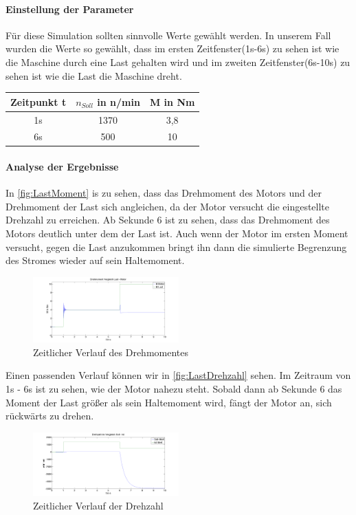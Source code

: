 \paragraph{Einstellung der Parameter}
	Für diese Simulation sollten sinnvolle Werte gewählt werden. In unserem Fall wurden die Werte so gewählt, dass im ersten Zeitfenster(1s-6s) zu sehen ist wie die Maschine durch eine Last gehalten wird und im zweiten Zeitfenster(6s-10s) zu sehen ist wie die Last die Maschine dreht.\\\par
	\begin{center}
		\begin{tabular}{c|c|c}
			Zeitpunkt t & $n_{Soll}$ in n/min & M in Nm\\ \hline
			1s & 1370 & 3,8\\
			6s & 500 & 10\\
		\end{tabular}
	\end{center}
\paragraph{Analyse der Ergebnisse}
	In \autoref{fig:LastMoment} is zu sehen, dass das Drehmoment des Motors und der Drehmoment der Last sich angleichen, da der Motor versucht die eingestellte Drehzahl zu erreichen. Ab Sekunde 6 ist zu sehen, dass das Drehmoment des Motors deutlich unter dem der Last ist. 
	Auch wenn der Motor im ersten Moment versucht, gegen die Last anzukommen bringt ihn dann die simulierte Begrenzung des Stromes wieder auf sein Haltemoment.
	\begin{figure}[H]
		\includegraphics[width=0.5\textwidth]{pictures/LastMoment.png}
		\caption{Zeitlicher Verlauf des Drehmomentes}
		\label{fig:LastMoment}
	\end{figure}
	Einen passenden Verlauf können wir in \autoref{fig:LastDrehzahl} sehen. Im Zeitraum von 1s - 6s ist zu sehen, wie der Motor nahezu steht. Sobald dann ab Sekunde 6 das Moment der Last größer als sein Haltemoment wird, fängt der Motor an, sich rückwärts zu drehen.
	\begin{figure}[H]
		\includegraphics[width=0.5\textwidth]{pictures/LastDrehzahl.png}
		\caption{Zeitlicher Verlauf der Drehzahl}
		\label{fig:LastDrehzahl}
	\end{figure}
